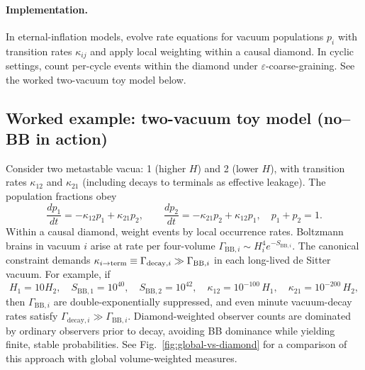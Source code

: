 \documentclass[12pt]{article}
\theoremstyle{remark}
\begin{document}
\paragraph{Implementation.} In eternal-inflation models, evolve rate equations for vacuum populations $p_i$ with transition rates $\kappa_{ij}$ and apply local weighting within a causal diamond. In cyclic settings, count per-cycle events within the diamond under $\varepsilon$-coarse-graining. See the worked two-vacuum toy model below.

\subsection*{Worked example: two-vacuum toy model (no--BB in action)}
Consider two metastable vacua: 1 (higher $H$) and 2 (lower $H$), with transition rates $\kappa_{12}$ and $\kappa_{21}$ (including decays to terminals as effective leakage). The population fractions obey
\begin{equation}
 \frac{dp_1}{dt}= -\kappa_{12} p_1 + \kappa_{21} p_2,\qquad \frac{dp_2}{dt}= -\kappa_{21} p_2 + \kappa_{12} p_1,\quad p_1{+}p_2=1.
\end{equation}
Within a causal diamond, weight events by local occurrence rates. Boltzmann brains in vacuum $i$ arise at rate per four-volume $\Gamma_{\mathrm{BB},i}\sim H_i^4 e^{-S_{\mathrm{BB},i}}$. The canonical constraint demands $\kappa_{i\to{\rm term}}\equiv \Gamma_{\mathrm{decay},i} \gg \Gamma_{\mathrm{BB},i}$ in each long-lived de Sitter vacuum. For example, if
\[
 H_1=10 H_2,\quad S_{\mathrm{BB},1}=10^{40},\quad S_{\mathrm{BB},2}=10^{42},\quad \kappa_{12}=10^{-100}\,H_1,\quad \kappa_{21}=10^{-200}\,H_2,
\]
then $\Gamma_{\mathrm{BB},i}$ are double-exponentially suppressed, and even minute vacuum-decay rates satisfy $\Gamma_{\mathrm{decay},i}\!\gg\!\Gamma_{\mathrm{BB},i}$. Diamond-weighted observer counts are dominated by ordinary observers prior to decay, avoiding BB dominance while yielding finite, stable probabilities. See Fig.~\ref{fig:global-vs-diamond} for a comparison of this approach with global volume-weighted measures.
\end{document}
